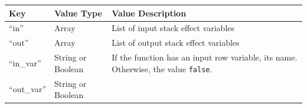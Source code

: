 \documentclass[
]{article}
\begin{document}
\begin{longtable}[]{@{}lll@{}}
\toprule
\begin{minipage}[b]{0.07\columnwidth}\raggedright
Key\strut
\end{minipage} & \begin{minipage}[b]{0.06\columnwidth}\raggedright
Value Type\strut
\end{minipage} & \begin{minipage}[b]{0.78\columnwidth}\raggedright
Value Description\strut
\end{minipage}\tabularnewline
\midrule
\endhead
\begin{minipage}[t]{0.07\columnwidth}\raggedright
``in''\strut
\end{minipage} & \begin{minipage}[t]{0.06\columnwidth}\raggedright
Array\strut
\end{minipage} & \begin{minipage}[t]{0.78\columnwidth}\raggedright
List of input stack effect variables\strut
\end{minipage}\tabularnewline
\begin{minipage}[t]{0.07\columnwidth}\raggedright
``out''\strut
\end{minipage} & \begin{minipage}[t]{0.06\columnwidth}\raggedright
Array\strut
\end{minipage} & \begin{minipage}[t]{0.78\columnwidth}\raggedright
List of output stack effect variables\strut
\end{minipage}\tabularnewline
\begin{minipage}[t]{0.07\columnwidth}\raggedright
``in\_var''\strut
\end{minipage} & \begin{minipage}[t]{0.06\columnwidth}\raggedright
String or Boolean\strut
\end{minipage} & \begin{minipage}[t]{0.78\columnwidth}\raggedright
If the function has an input row variable, its name. Otherwise, the
value \texttt{false}.\strut
\end{minipage}\tabularnewline
\begin{minipage}[t]{0.07\columnwidth}\raggedright
``out\_var''\strut
\end{minipage} & \begin{minipage}[t]{0.06\columnwidth}\raggedright
String or Boolean\strut
\end{minipage} & \begin{minipage}[t]{0.78\columnwidth}\raggedright

\end{minipage}
\end{longtable}
\end{document}
